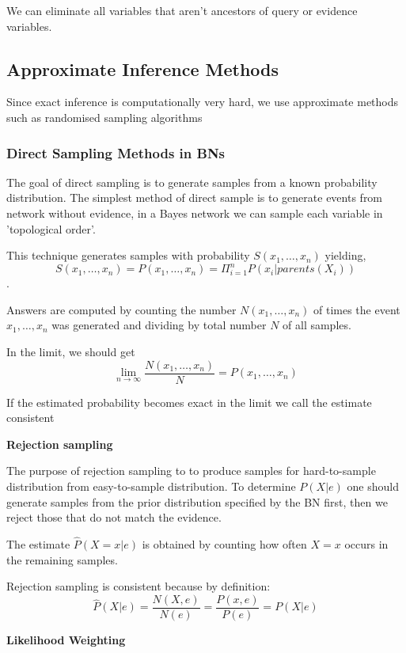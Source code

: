 \documentclass{article}
\begin{document}
We can eliminate all variables that aren't ancestors of query or evidence variables.

\subsection{Approximate Inference Methods}

Since exact inference is computationally very hard, we use approximate methods such as randomised sampling algorithms

\subsubsection{Direct Sampling Methods in BNs}

The goal of direct sampling is to generate samples from a known probability distribution. The simplest method of direct sample is to generate events from network without evidence, in a Bayes network we can sample each variable in 'topological order'. 

This technique generates samples with probability $S(x_1, \ldots, x_n)$ yielding, $$S(x_1, \ldots, x_n) = P(x_1, \ldots, x_n) = \Pi_{i=1}^n P(x_i | parents(X_i))$$. 

Answers are computed by counting the number $N(x_1, \ldots, x_n)$ of times the event $x_1, \ldots, x_n$ was generated and dividing by total number $N$ of all samples.

In the limit, we should get $$\lim_{n \to \infty} \frac{N(x_1, \ldots, x_n)}{N} = P(x_1, \ldots, x_n)$$

If the estimated probability becomes exact in the limit we call the estimate consistent \newline

\textbf{Rejection sampling} \newline

The purpose of rejection sampling to to produce samples for hard-to-sample distribution from easy-to-sample distribution. To determine $P(X|e)$ one should generate samples from the prior distribution specified by the BN first, then we reject those that do not match the evidence. 

The estimate $\hat{P} (X = x|e)$ is obtained by counting how often $X = x$ occurs in the remaining samples.

Rejection sampling is consistent because by definition: $$\hat{P} (X|e) = \frac{N(X, e)}{N(e)} = \frac{P(x, e)}{P(e)} = P(X|e)$$ 

\textbf{Likelihood Weighting} \newline
\end{document}
